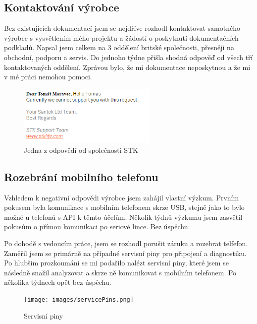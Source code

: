 \documentclass[FM,DP]{tulthesis}  %
\begin{document}
\subsection{Kontaktování výrobce}
Bez existujících dokumentací jsem se nejdříve rozhodl kontaktovat samotného výrobce s vysvětlením mého projektu a žádostí o poskytnutí dokumentačních podkladů. Napsal jsem celkem na 3 oddělení britské společnosti, přesněji na obchodní, podporu a servis. Do jednoho týdne přišla shodná odpověď od všech tří kontaktovaných oddělení. Zprávou bylo, že mi dokumentace neposkytnou a že mi v mé práci nemohou pomoci.

\begin{figure}[H]
\begin{center}
\includegraphics[width=0.6\textwidth]{images/response.png}
\caption{Jedna z odpovědí od společnosti STK}
\label{image}
\end{center}
\end{figure}

\subsection{Rozebrání mobilního telefonu}
Vzhledem k negativní odpovědi výrobce jsem zahájil vlastní výzkum. Prvním pokusem byla komunikace s mobilním telefonem skrze USB, stejně jako to bylo možné u telefonů s API k těmto účelům. Několik týdnů výzkumu jsem zasvětil pokusům o přímou komunikaci po seriové lince. Bez úspěchu.

Po dohodě s vedoucím práce, jsem se rozhodl porušit záruku a rozebrat telfefon. Zaměřil jsem se primárně na případné servisní piny pro připojení a diagnostiku. Po hlubším prozkoumání se mi podařilo nalézt servisní piny, které jsem se následně snažil analyzovat a skrze ně komunikovat s mobilním telefonem. Po několika týdnech opět bez úspěchu.

\begin{figure}[H]
\begin{center}
\texttt{[image: images/servicePins.png]}
\caption{Servisní piny}
\label{image}
\end{center}
\end{figure}
\end{document}
